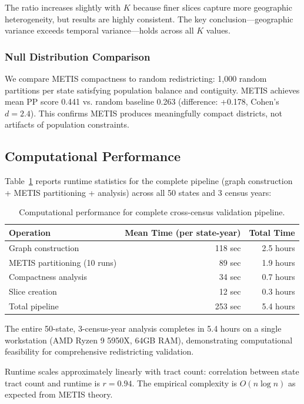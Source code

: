 The ratio increases slightly with $K$ because finer slices capture more geographic heterogeneity, but results are highly consistent. The key conclusion—geographic variance exceeds temporal variance—holds across all $K$ values.

\subsubsection{Null Distribution Comparison}

We compare METIS compactness to random redistricting: 1,000 random partitions per state satisfying population balance and contiguity. METIS achieves mean PP score 0.441 vs. random baseline 0.263 (difference: +0.178, Cohen's $d=2.4$). This confirms METIS produces meaningfully compact districts, not artifacts of population constraints.

\subsection{Computational Performance}

Table~\ref{tab:runtime} reports runtime statistics for the complete pipeline (graph construction + METIS partitioning + analysis) across all 50 states and 3 census years:

\begin{table}[t]
\centering
\caption{Computational performance for complete cross-census validation pipeline.}
\label{tab:runtime}
\begin{tabular}{lrr}
\toprule
Operation & Mean Time (per state-year) & Total Time \\
\midrule
Graph construction & 118 sec & 2.5 hours \\
METIS partitioning (10 runs) & 89 sec & 1.9 hours \\
Compactness analysis & 34 sec & 0.7 hours \\
Slice creation & 12 sec & 0.3 hours \\
\midrule
Total pipeline & 253 sec & 5.4 hours \\
\bottomrule
\end{tabular}
\end{table}

The entire 50-state, 3-census-year analysis completes in 5.4 hours on a single workstation (AMD Ryzen 9 5950X, 64GB RAM), demonstrating computational feasibility for comprehensive redistricting validation.

Runtime scales approximately linearly with tract count: correlation between state tract count and runtime is $r=0.94$. The empirical complexity is $O(n \log n)$ as expected from METIS theory.

